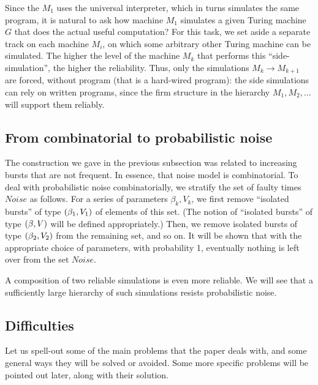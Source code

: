 \documentclass[12pt]{memoir}
\newcommand{\Noise}{\mathit{Noise}}
\begin{document}
Since the \( M_1 \) uses the universal interpreter, which in turns
simulates the same program, it is natural to ask
how  machine \( M_1 \) simulates a given Turing machine \( G \) that does the 
actual useful computation?
For this task, we set aside a separate track 
on each machine \( M_i \), on which some arbitrary other Turing machine can be
simulated.
The higher the level of the machine \( M_{k} \) that performs this
``side-simulation'', the higher the reliability.
Thus, only the simulations \( M_{k}\to M_{k+1} \) are forced, without program
(that is a hard-wired program):
the side simulations can rely on written programs, since the firm
structure in the hierarchy \( M_{1},M_{2},\dots \) will support them reliably.



\subsection{From combinatorial to probabilistic noise}

The construction we gave in the previous subsection
was related to increasing bursts that are not frequent.
In essence, that noise model is combinatorial.
To deal with probabilistic noise combinatorially,
we stratify the set of faulty times \( \Noise \) as follows.
For a series of parameters \( \beta_{k}, V_{k} \),
we first remove ``isolated bursts'' of type \( (\beta_{1},V_{1}) \) of elements of this set.
(The notion of ``isolated bursts'' of type \( (\beta,V) \)
will be defined appropriately.)
Then, we remove isolated bursts of type \( (\beta_{2},V_{2}) \) from the remaining set,
and so on.
It will be shown that with the appropriate choice of parameters, with probability 1,
eventually nothing is left over from the set \( \Noise \).

A composition of two reliable simulations is even more reliable.
We will see that a sufficiently large hierarchy of such
simulations resists probabilistic noise.


\subsection{Difficulties}\label{sec:novelties}

Let us spell-out some of the main problems that the paper deals with, 
and some general ways they will be solved or avoided.
Some more specific problems will be pointed out later, along with their solution.
\end{document}
